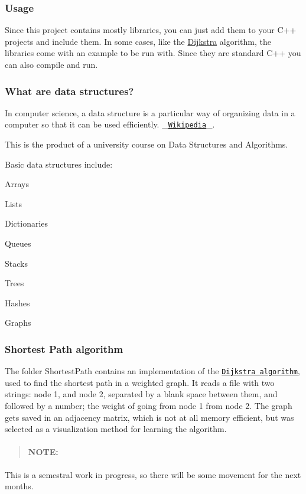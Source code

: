 \subsubsection*{Usage}

Since this project contains mostly libraries, you can just add them to your C++ projects and include them. In some cases, like the \hyperlink{class_dijkstra}{Dijkstra} algorithm, the libraries come with an example to be run with. Since they are standard C++ you can also compile and run. \subsubsection*{What are data structures?}

In computer science, a data structure is a particular way of organizing data in a computer so that it can be used efficiently. \+\_\+\href{https://en.wikipedia.org/wiki/Data_structure}{\tt Wikipedia}\+\_\+.

This is the product of a university course on Data Structures and Algorithms.

Basic data structures include\+:
\begin{DoxyItemize}
\item Arrays
\item Lists
\item Dictionaries
\item Queues
\item Stacks
\item Trees
\item Hashes
\item Graphs
\end{DoxyItemize}

\subsubsection*{Shortest Path algorithm}

The folder Shortest\+Path contains an implementation of the \href{http://en.wikipedia.org/wiki/Dijkstra%27s_algorithm}{\tt Dijkstra algorithm}, used to find the shortest path in a weighted graph. It reads a file with two strings\+: node 1, and node 2, separated by a blank space between them, and followed by a number; the weight of going from node 1 from node 2. The graph gets saved in an adjacency matrix, which is not at all memory efficient, but was selected as a visualization method for learning the algorithm.

\begin{quote}
\paragraph*{N\+O\+T\+E\+:}

\end{quote}
This is a semestral work in progress, so there will be some movement for the next months. 
